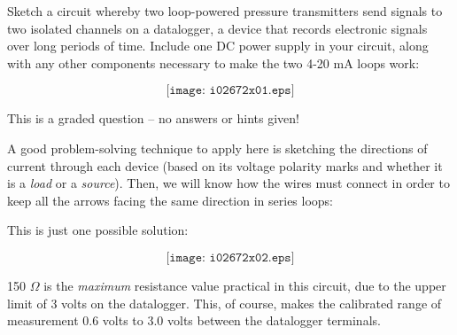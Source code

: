 

Sketch a circuit whereby two loop-powered pressure transmitters send signals to two isolated channels on a datalogger, a device that records electronic signals over long periods of time.  Include one DC power supply in your circuit, along with any other components necessary to make the two 4-20 mA loops work:

$$\texttt{[image: i02672x01.eps]}$$

\vfil 

\eject






This is a graded question -- no answers or hints given!







A good problem-solving technique to apply here is sketching the directions of current through each device (based on its voltage polarity marks and whether it is a {\it load} or a {\it source}).  Then, we will know how the wires must connect in order to keep all the arrows facing the same direction in series loops:

\vskip 10pt

This is just one possible solution:

$$\texttt{[image: i02672x02.eps]}$$

150 $\Omega$ is the {\it maximum} resistance value practical in this circuit, due to the upper limit of 3 volts on the datalogger.  This, of course, makes the calibrated range of measurement 0.6 volts to 3.0 volts between the datalogger terminals.




